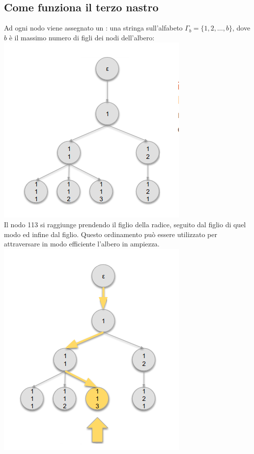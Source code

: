 \subsection{Come funziona il terzo nastro }
Ad ogni nodo viene assegnato un : una stringa sull'alfabeto $\Gamma_b = \{1,2,\dots,b\}$, 
dove $b$ è il massimo numero di figli dei nodi dell'albero: \\
\includegraphics[scale=0.5]{img/albero_2.png}\\
Il nodo 113 si raggiunge prendendo il  figlio della radice, seguito dal  figlio di quel modo ed infine dal  figlio. 
Questo ordinamento può essere utilizzato per attraversare in modo efficiente l'albero in ampiezza.\\
\includegraphics[scale=0.5]{img/albero_3.png}

